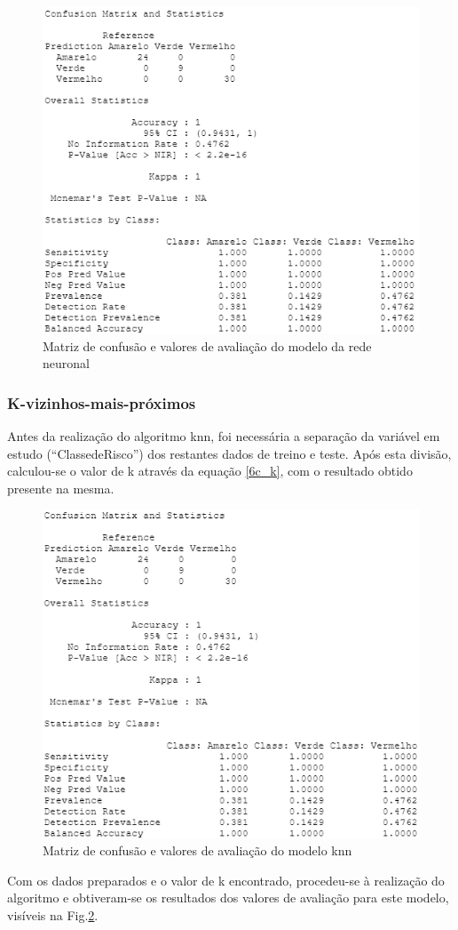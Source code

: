 \documentclass[conference]{IEEEtran}
\begin{document}
\begin{figure}[htbp]
\centerline{\includegraphics[width=0.95\columnwidth]{images/08_4.png}}
\caption{Matriz de confusão e valores de avaliação do modelo da rede neuronal}
\label{8b_confusionmatrix}
\end{figure}


\subsubsection{K-vizinhos-mais-próximos}
Antes da realização do algoritmo knn, foi necessária a separação da variável em estudo (“ClassedeRisco”) dos restantes dados de treino e teste. Após esta divisão, calculou-se o valor de k através da equação \eqref{6c_k}, com o resultado obtido presente na mesma.

\begin{figure}[htbp]
\centerline{\includegraphics[width=0.95\columnwidth]{images/08_5.png}}
\caption{Matriz de confusão e valores de avaliação do modelo knn}
\label{8c_confusionmatrix}
\end{figure}
Com os dados preparados e o valor de k encontrado, procedeu-se à realização do algoritmo e obtiveram-se os resultados dos valores de avaliação para este modelo, visíveis na Fig.\ref{8c_confusionmatrix}.
\end{document}
